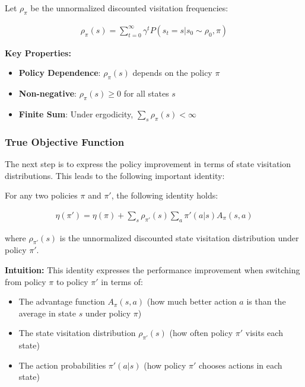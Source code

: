 Let $\rho_\pi$ be the unnormalized discounted visitation frequencies:

\begin{align*}
    \rho_\pi(s) = \sum_{t=0}^{\infty} \gamma^t P(s_t = s | s_0 \sim \rho_0, \pi)
\end{align*}

\textbf{Key Properties:}
\begin{itemize}
    \item \textbf{Policy Dependence}: $\rho_\pi(s)$ depends on the policy $\pi$
    \item \textbf{Non-negative}: $\rho_\pi(s) \geq 0$ for all states $s$
    \item \textbf{Finite Sum}: Under ergodicity, $\sum_s \rho_\pi(s) < \infty$
\end{itemize}

\subsubsection{True Objective Function}

The next step is to express the policy improvement in terms of state visitation distributions. This leads to the following important identity:

\begin{theorem}
For any two policies $\pi$ and $\pi'$, the following identity holds:

\begin{align}\label{true_objective}
    \eta(\pi') = \eta(\pi) + \sum_{s}\rho_{\pi'}(s)\sum_{a}\pi'(a|s)A_{\pi}(s, a)
\end{align}

where $\rho_{\pi'}(s)$ is the unnormalized discounted state visitation distribution under policy $\pi'$.
\end{theorem}

\textbf{Intuition:}
This identity expresses the performance improvement when switching from policy $\pi$ to policy $\pi'$ in terms of:
\begin{itemize}
    \item The advantage function $A_\pi(s,a)$ (how much better action $a$ is than the average in state $s$ under policy $\pi$)
    \item The state visitation distribution $\rho_{\pi'}(s)$ (how often policy $\pi'$ visits each state)
    \item The action probabilities $\pi'(a|s)$ (how policy $\pi'$ chooses actions in each state)
\end{itemize}

